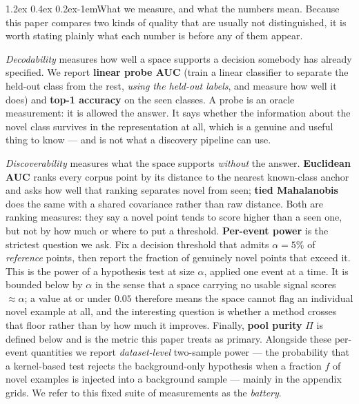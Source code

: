 \documentclass{article}
\makeatletter
\renewcommand\paragraph{\@startsection{paragraph}{4}{\z@}%
  {1.2ex \@plus 0.4ex \@minus 0.2ex}{-1em}{\normalsize\bf}}
\makeatother
\begin{document}
\paragraph{What we measure, and what the numbers mean.}
Because this paper compares two kinds of quality that are usually not
distinguished, it is worth stating plainly what each number is before any of
them appear.

\emph{Decodability} measures how well a space supports a decision somebody has
already specified. We report \textbf{linear probe AUC} \citep{alain2017probes} (train a linear
classifier to separate the held-out class from the rest, \emph{using the
held-out labels}, and measure how well it does) and \textbf{top-1 accuracy} on
the seen classes. A probe is an oracle measurement: it is allowed the answer.
It says whether the information about the novel class survives in the
representation at all, which is a genuine and useful thing to know --- and is
not what a discovery pipeline can use.

\emph{Discoverability} measures what the space supports \emph{without} the
answer. \textbf{Euclidean AUC} ranks every corpus point by its distance to the
nearest known-class anchor and asks how well that ranking separates novel from
seen; \textbf{tied Mahalanobis} does the same with a shared covariance rather
than raw distance. Both are ranking measures: they say a novel point tends to
score higher than a seen one, but not by how much or where to put a threshold.
\textbf{Per-event power} is the strictest question we ask. Fix a decision
threshold that admits $\alpha = 5\%$ of \emph{reference} points, then report
the fraction of genuinely novel points that exceed it. This is the power of a
hypothesis test at size $\alpha$, applied one event at a time. It is bounded
below by $\alpha$ in the sense that a space carrying no usable signal scores
$\approx \alpha$; a value at or under $0.05$ therefore means the space cannot
flag an individual novel example at all, and the interesting question is
whether a method crosses that floor rather than by how much it improves.
Finally, \textbf{pool purity} $\Pi$ is defined below and is the metric this
paper treats as primary. Alongside these per-event quantities we report
\emph{dataset-level} two-sample power --- the probability that a kernel-based
test \citep[SparKer, Mahalanobis or maximum mean discrepancy;][]{grosso2025sparker,lee2018mahalanobis,gretton2012mmd} rejects the
background-only hypothesis when a fraction $f$ of novel examples is injected
into a background sample --- mainly in the appendix grids. We refer to this
fixed suite of measurements as the \emph{battery}.
\end{document}
